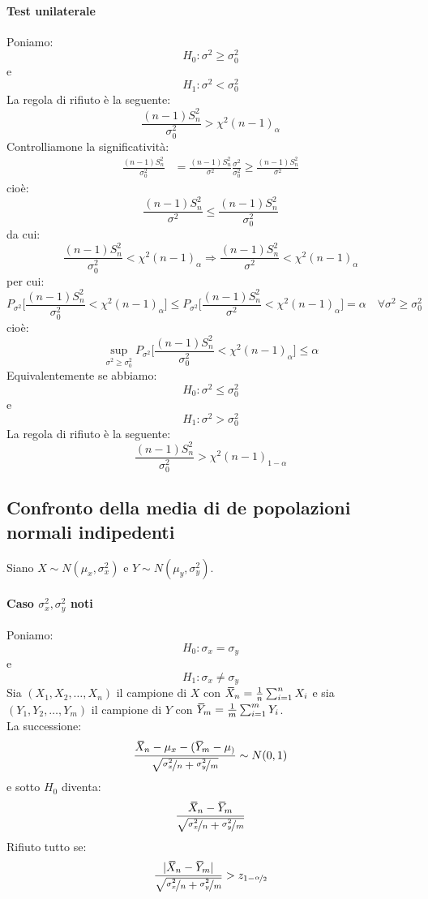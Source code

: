 \documentclass[12pt]{report}
\newcommand{\wbar}[1]{%
	\accentset{\mbox{\rule{0.55em}{0.5pt}}}{#1}%
}
\begin{document}
		\paragraph{Test unilaterale}  Poniamo:
		\[
		H_0: \sigma^2 \geq \sigma_0^2
		\]
		e
		\[
		H_1: \sigma^2  < \sigma_0^2
		\]
		La regola di rifiuto è la seguente:
		\[
		\frac{(n-1)S_n^2}{\sigma_0^2} > \chi^2(n-1)_{\alpha}
		\]
		Controlliamone la significatività:
		\begin{align*}
			\frac{(n-1)S_n^2}{\sigma_0^2} &= \frac{(n-1)S_n^2}{\sigma^2} \frac{\sigma^2}{\sigma_0^2} \geq \frac{(n-1)S_n^2}{\sigma^2}
		\end{align*}
		cioè:
		\[
		\frac{(n-1)S_n^2}{\sigma^2} \leq \frac{(n-1)S_n^2}{\sigma_0^2}
		\]
		da cui:
		\[
		\frac{(n-1)S_n^2}{\sigma_0^2} < \chi^2(n-1)_{\alpha} \Rightarrow \frac{(n-1)S_n^2}{\sigma^2} < \chi^2(n-1)_{\alpha}
		\]
		per cui:
		\[
		P_{\sigma^2}\Bigg[\frac{(n-1)S_n^2}{\sigma_0^2} < \chi^2(n-1)_\alpha\Bigg] \leq P_{\sigma^2}\Bigg[\frac{(n-1)S_n^2}{\sigma^2} < \chi^2(n-1)_{\alpha}\Bigg] = \alpha \quad \forall \sigma^2\geq \sigma_0^2
		\]
		cioè:
		\[
		\underset{\sigma^2 \geq \sigma_0^2}{\sup}P_{\sigma^2}\Bigg[\frac{(n-1)S_n^2}{\sigma_0^2} < \chi^2(n-1)_{\alpha}\Bigg] \leq \alpha
		\]
		Equivalentemente se abbiamo:
		\[
		H_0: \sigma^2 \leq \sigma_0^2
		\]
		e
		\[
		H_1: \sigma^2  > \sigma_0^2
		\]
		La regola di rifiuto è la seguente:
		\[
		\frac{(n-1)S_n^2}{\sigma_0^2} > \chi^2(n-1)_{1-\alpha}
		\]
		\subsection{Confronto della media di de popolazioni normali indipedenti}
		Siano $X \sim N(\mu_x, \sigma^2_x)$ e $Y \sim N(\mu_y, \sigma^2_y)$.
		\paragraph{Caso $\sigma^2_x, \sigma^2_y$ noti}
		Poniamo:
		\[
		H_0: \sigma_x = \sigma_y
		\]
		e
		\[
		H_1: \sigma_x \neq \sigma_y
		\]
		Sia $(X_1, X_2, \dots, X_n)$ il campione di $X$ con $\wbar{X}_n = \frac{1}{n}\sum_{i=1}^{n}X_i$ e sia $(Y_1, Y_2, \dots, Y_m)$ il campione di $Y$ con $\wbar{Y}_m =  \frac{1}{m}\sum_{i=1}^{m}Y_i$. \\
		La successione:
		\[
		\frac{\wbar{X}_n - \mu_x - (\wbar{Y}_m - \mu_)}{\sqrt{\nicefrac{\sigma^2_x}{n} + \nicefrac{\sigma^2_y}{m}}} \sim N(0, 1)
		\]
		e sotto $H_0$ diventa:
		\[
\frac{\wbar{X}_n  - \wbar{Y}_m}{\sqrt{\nicefrac{\sigma^2_x}{n} + \nicefrac{\sigma^2_y}{m}}}
		\]
		Rifiuto tutto se:
		\[
\frac{|\wbar{X}_n  - \wbar{Y}_m|}{\sqrt{\nicefrac{\sigma^2_x}{n} + \nicefrac{\sigma^2_y}{m}}} > z_{1 - \nicefrac{\alpha}{2}}
		\]
\end{document}
